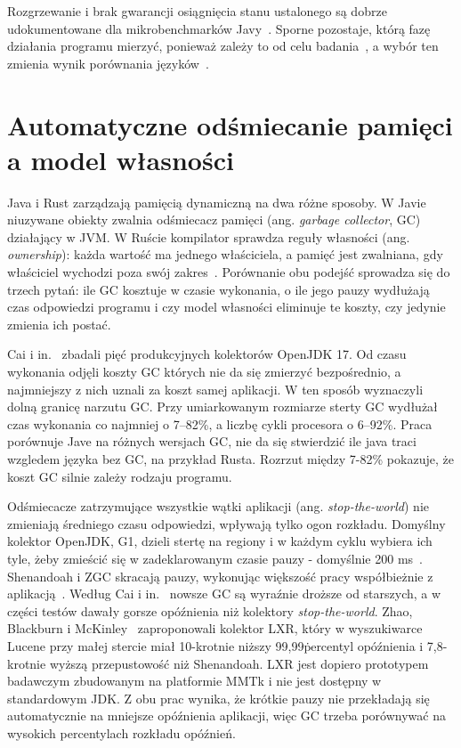 Rozgrzewanie i brak gwarancji osiągnięcia stanu ustalonego są dobrze udokumentowane dla mikrobenchmarków Javy~\cite{traini2023}.
Sporne pozostaje, którą fazę działania programu mierzyć, ponieważ zależy to od celu badania~\cite{blackburn2025}, a wybór ten zmienia wynik porównania języków~\cite{vankempen2025}.

\section{Automatyczne odśmiecanie pamięci a model własności}
\label{sec:gc-a-ownership}

Java i Rust zarządzają pamięcią dynamiczną na dwa różne sposoby.
W Javie niuzywane obiekty zwalnia odśmiecacz pamięci (ang. \textit{garbage collector}, GC) działający w JVM.
W Ruście kompilator sprawdza reguły własności (ang. \textit{ownership}): każda wartość ma jednego właściciela, a pamięć jest zwalniana, gdy właściciel wychodzi poza swój zakres~\cite{klabnik-rustbook}.
Porównanie obu podejść sprowadza się do trzech pytań: ile GC kosztuje w czasie wykonania, o ile jego pauzy wydłużają czas odpowiedzi programu i czy model własności eliminuje te koszty, czy jedynie zmienia ich postać.

Cai i in.~\cite{cai2022} zbadali pięć produkcyjnych kolektorów OpenJDK 17.
Od czasu wykonania odjęli koszty GC których nie da się zmierzyć bezpośrednio, a najmniejszy z nich uznali za koszt samej aplikacji.
W ten sposób wyznaczyli dolną granicę narzutu GC.
Przy umiarkowanym rozmiarze sterty GC wydłużał czas wykonania co najmniej o 7--82\%, a liczbę cykli procesora o 6--92\%.
Praca porównuje Jave na różnych wersjach GC, nie da się stwierdzić ile java traci wzgledem języka bez GC, na przykład Rusta.
Rozrzut między 7-82\% pokazuje, że koszt GC silnie zależy rodzaju programu.

Odśmiecacze zatrzymujące wszystkie wątki aplikacji (ang. \textit{stop-the-world}) nie zmieniają średniego czasu odpowiedzi, wpływają tylko ogon rozkładu.
Domyślny kolektor OpenJDK, G1, dzieli stertę na regiony i w każdym cyklu wybiera ich tyle, żeby zmieścić się w zadeklarowanym czasie pauzy - domyślnie 200 ms~\cite{oracle-g1-25}.
Shenandoah i ZGC skracają pauzy, wykonując większość pracy współbieżnie z aplikacją~\cite{flood2016,jep333}.
Według Cai i in.~\cite{cai2022} nowsze GC są wyraźnie droższe od starszych, a w części testów dawały gorsze opóźnienia niż kolektory \textit{stop-the-world}.
Zhao, Blackburn i McKinley~\cite{zhao2022} zaproponowali kolektor LXR, który w wyszukiwarce Lucene przy małej stercie miał 10-krotnie niższy 99,99\. percentyl opóźnienia i 7,8-krotnie wyższą przepustowość niż Shenandoah.
LXR jest dopiero prototypem badawczym zbudowanym na platformie MMTk i nie jest dostępny w standardowym JDK.
Z obu prac wynika, że krótkie pauzy nie przekładają się automatycznie na mniejsze opóźnienia aplikacji, więc GC trzeba porównywać na wysokich percentylach rozkładu opóźnień.

